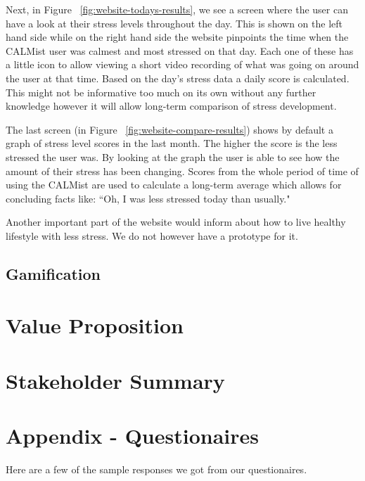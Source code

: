 \documentclass{scrartcl}
\begin{document}
Next, in Figure ~\ref{fig:website-todays-results}, we see a screen where the user can have a look at their stress levels throughout the day. This is shown on the left hand side while on the right hand side the website pinpoints the time when the CALMist user was calmest and most stressed on that day. Each one of these has a little icon to allow viewing a short video recording of what was going on around the user at that time. Based on the day's stress data a daily score is calculated. This might not be informative too much on its own without any further knowledge however it will allow long-term comparison of stress development.

The last screen (in Figure ~\ref{fig:website-compare-results}) shows by default a graph of stress level scores in the last month. The higher the score is the less stressed the user was. By looking at the graph the user is able to see how the amount of their stress has been changing. Scores from the whole period of time of using the CALMist are used to calculate a long-term average which allows for concluding facts like: ``Oh, I was less stressed today than usually."

Another important part of the website would inform about how to live healthy lifestyle with less stress. We do not however have a prototype for it.

\subsection{Gamification}

\section{Value Proposition}

\section{Stakeholder Summary}

\section{Appendix - Questionaires}
Here are a few of the sample responses we got from our questionaires.






\end{document}

